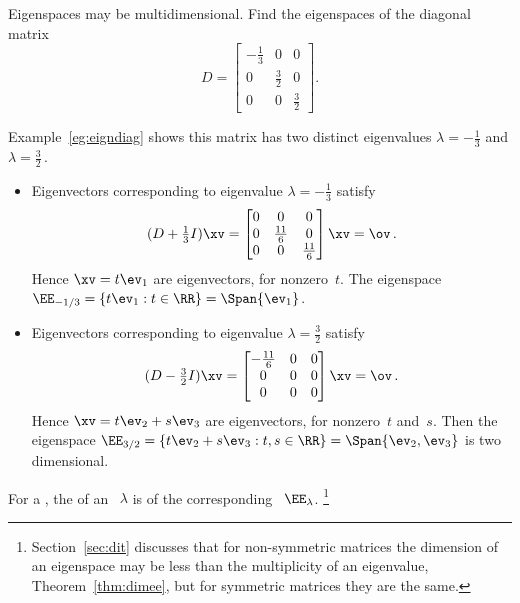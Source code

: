 \begin{example} \label{eg:espace2d}
Eigenspaces may be multidimensional.  
Find the eigenspaces of the diagonal matrix
\begin{equation*}
D=\begin{bmatrix} -\frac13&0&0\\0&\frac32&0\\0&0&\frac32 \end{bmatrix}.
\end{equation*}
\begin{solution} 
Example~\ref{eg:eigndiag} shows this matrix has two distinct eigenvalues \(\lambda=-\frac13\) and \(\lambda=\frac32\)\,.
\begin{itemize}
\item Eigenvectors corresponding to eigenvalue \(\lambda=-\frac13\) satisfy
\begin{equation*}
(D+\tfrac13I)\xv=\begin{bmatrix} 0&0&0\\0&\frac{11}6&0\\0&0&\frac{11}6 \end{bmatrix}\xv=\ov\,.
\end{equation*}
Hence \(\xv=t\ev_1\) are eigenvectors, for nonzero~\(t\).
The eigenspace \(\EE_{-1/3}=\{t\ev_1 : t\in\RR\}=\Span\{\ev_1\}\).

\item Eigenvectors corresponding to eigenvalue \(\lambda=\frac32\) satisfy
\begin{equation*}
(D-\tfrac32I)\xv=\begin{bmatrix} -\frac{11}6&0&0\\0&0&0\\0&0&0 \end{bmatrix}\xv=\ov\,.
\end{equation*}
Hence \(\xv=t\ev_2+s\ev_3\) are eigenvectors, for nonzero~\(t\) and~\(s\).
Then the eigenspace \(\EE_{3/2}=\{t\ev_2+s\ev_3 : t,s\in\RR\}=\Span\{\ev_2,\ev_3\}\) is two dimensional.

\end{itemize}
\end{solution}
\end{example}




\begin{definition} \label{def:eigsymult}
For a , the  of an ~\(\lambda\) is  of the corresponding ~\(\EE_\lambda\). 
\footnote{Section~\ref{sec:dit} discusses that for non-symmetric matrices the dimension of an eigenspace may be less than the multiplicity of an eigenvalue, Theorem~\ref{thm:dimee}, but for symmetric matrices they are the same.}
\end{definition}



